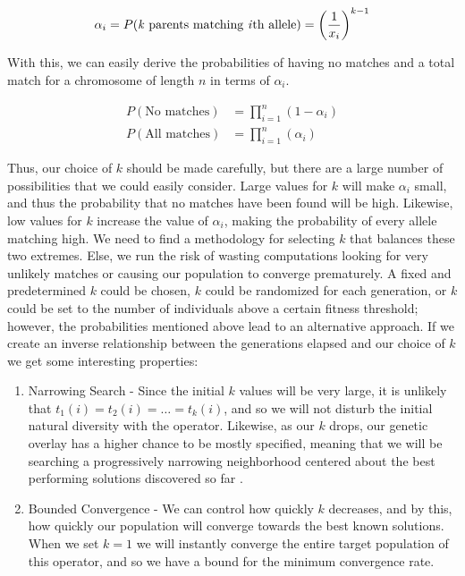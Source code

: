 \[ \alpha_i = P(\text{\emph{k} parents matching \emph{i}th allele}) = \left(\frac{1}{x_i}\right)^{k-1} \]

With this, we can easily derive the probabilities of having no matches and a total match for a chromosome of length $n$ in terms of $\alpha_i$.

\begin{align*}
P( \text{No matches})&= \prod\limits_{i = 1}^n (1 - \alpha_i) \\
P( \text{All matches})&= \prod\limits_{i = 1}^n (\alpha_i)
\end{align*}

Thus, our choice of $k$ should be made carefully, but there are a large number of possibilities that we could easily consider. Large values for $k$ will make $\alpha_i$ small, and thus the probability that no matches have been found will be high. Likewise, low values for $k$ increase the value of $\alpha_i$, making the probability of every allele matching high. We need to find a methodology for selecting $k$ that balances these two extremes. Else, we run the risk of wasting computations looking for very unlikely matches or causing our population to converge prematurely. A fixed and predetermined $k$ could be chosen, $k$ could be randomized for each generation, or $k$ could be set to the number of individuals above a certain fitness threshold; however, the probabilities mentioned above lead to an alternative approach. If we create an inverse relationship between the generations elapsed and our choice of $k$ we get some interesting properties:

\begin{enumerate}

\item Narrowing Search - Since the initial $k$ values will be very large, it is unlikely that $t_1(i) = t_2(i) = \ldots = t_k(i)$, and so we will not disturb the initial natural diversity with the operator.  Likewise, as our $k$ drops, our genetic overlay has a higher chance to be mostly specified, meaning that we will be searching a progressively narrowing neighborhood centered about the best performing solutions discovered so far \cite{Neri11}.

\item Bounded Convergence - We can control how quickly $k$ decreases, and by this, how quickly our population will converge towards the best known solutions. When we set $k=1$ we will instantly converge the entire target population of this operator, and so we have a bound for the minimum convergence rate.

\end{enumerate}

